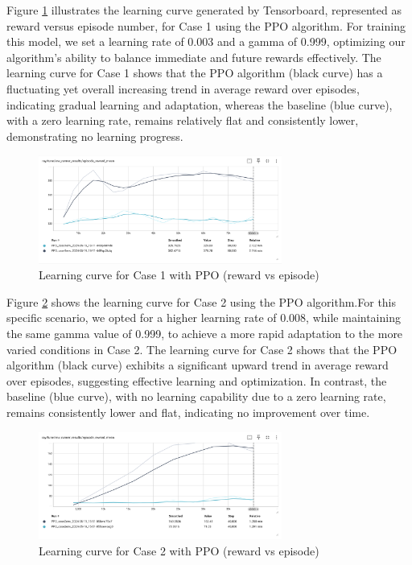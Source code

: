 \documentclass[conference]{IEEEtran}
\begin{document}
Figure \ref{fig:lc_c1_ppo} illustrates the learning curve generated by Tensorboard, represented as reward versus episode number, for Case 1 using the PPO algorithm. For training this model, we set a learning rate of 0.003 and a gamma of 0.999, optimizing our algorithm's ability to balance immediate and future rewards effectively.
The learning curve for Case 1 shows that the PPO algorithm (black curve) has a fluctuating yet overall increasing trend in average reward over episodes, indicating gradual learning and adaptation, whereas the baseline (blue curve), with a zero learning rate, remains relatively flat and consistently lower, demonstrating no learning progress.

\begin{figure}[htp]
    \centering
    \includegraphics[width=8cm]{images/LC_case1_PPO.png}
    \caption{Learning curve for Case 1 with PPO (reward vs episode)}
    \label{fig:lc_c1_ppo}
\end{figure}

Figure \ref{fig:lc_c2_ppo} shows the learning curve for Case 2 using the PPO algorithm.For this specific scenario, we opted for a higher learning rate of 0.008, while maintaining the same gamma value of 0.999, to achieve a more rapid adaptation to the more varied conditions in Case 2. The learning curve for Case 2 shows that the PPO algorithm (black curve) exhibits a significant upward trend in average reward over episodes, suggesting effective learning and optimization. In contrast, the baseline (blue curve), with no learning capability due to a zero learning rate, remains consistently lower and flat, indicating no improvement over time. 


\begin{figure}[htp]
    \centering
    \includegraphics[width=8cm]{images/LC_case2_PPO.png}
    \caption{Learning curve for Case 2 with PPO (reward vs episode)}
    \label{fig:lc_c2_ppo}
\end{figure}
\end{document}
